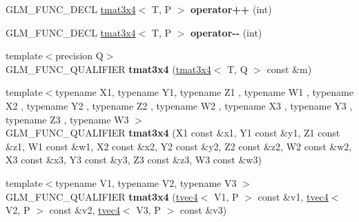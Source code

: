 \begin{DoxyCompactItemize}
\item 
\hypertarget{structglm_1_1detail_1_1tmat3x4_a0d29f6cf76c014e585bf389397fb1db6}{G\-L\-M\-\_\-\-F\-U\-N\-C\-\_\-\-D\-E\-C\-L \hyperlink{structglm_1_1detail_1_1tmat3x4}{tmat3x4}$<$ T, P $>$ {\bfseries operator++} (int)}\label{structglm_1_1detail_1_1tmat3x4_a0d29f6cf76c014e585bf389397fb1db6}

\item 
\hypertarget{structglm_1_1detail_1_1tmat3x4_a681cace6d7cfc6b5b96c076fefd47e11}{G\-L\-M\-\_\-\-F\-U\-N\-C\-\_\-\-D\-E\-C\-L \hyperlink{structglm_1_1detail_1_1tmat3x4}{tmat3x4}$<$ T, P $>$ {\bfseries operator-\/-\/} (int)}\label{structglm_1_1detail_1_1tmat3x4_a681cace6d7cfc6b5b96c076fefd47e11}

\item 
\hypertarget{structglm_1_1detail_1_1tmat3x4_affba87d33eccb3e78c8629791c7fc158}{{\footnotesize template$<$precision Q$>$ }\\G\-L\-M\-\_\-\-F\-U\-N\-C\-\_\-\-Q\-U\-A\-L\-I\-F\-I\-E\-R {\bfseries tmat3x4} (\hyperlink{structglm_1_1detail_1_1tmat3x4}{tmat3x4}$<$ T, Q $>$ const \&m)}\label{structglm_1_1detail_1_1tmat3x4_affba87d33eccb3e78c8629791c7fc158}

\item 
\hypertarget{structglm_1_1detail_1_1tmat3x4_a16b2c248a1909f7f319b8e050f93e3b4}{{\footnotesize template$<$typename X1, typename Y1, typename Z1 , typename W1 , typename X2 , typename Y2 , typename Z2 , typename W2 , typename X3 , typename Y3 , typename Z3 , typename W3 $>$ }\\G\-L\-M\-\_\-\-F\-U\-N\-C\-\_\-\-Q\-U\-A\-L\-I\-F\-I\-E\-R {\bfseries tmat3x4} (X1 const \&x1, Y1 const \&y1, Z1 const \&z1, W1 const \&w1, X2 const \&x2, Y2 const \&y2, Z2 const \&z2, W2 const \&w2, X3 const \&x3, Y3 const \&y3, Z3 const \&z3, W3 const \&w3)}\label{structglm_1_1detail_1_1tmat3x4_a16b2c248a1909f7f319b8e050f93e3b4}

\item 
\hypertarget{structglm_1_1detail_1_1tmat3x4_acace185cb00ee79dd090605deefb3dfa}{{\footnotesize template$<$typename V1, typename V2, typename V3 $>$ }\\G\-L\-M\-\_\-\-F\-U\-N\-C\-\_\-\-Q\-U\-A\-L\-I\-F\-I\-E\-R {\bfseries tmat3x4} (\hyperlink{structglm_1_1detail_1_1tvec4}{tvec4}$<$ V1, P $>$ const \&v1, \hyperlink{structglm_1_1detail_1_1tvec4}{tvec4}$<$ V2, P $>$ const \&v2, \hyperlink{structglm_1_1detail_1_1tvec4}{tvec4}$<$ V3, P $>$ const \&v3)}\label{structglm_1_1detail_1_1tmat3x4_acace185cb00ee79dd090605deefb3dfa}


\end{DoxyCompactItemize}
